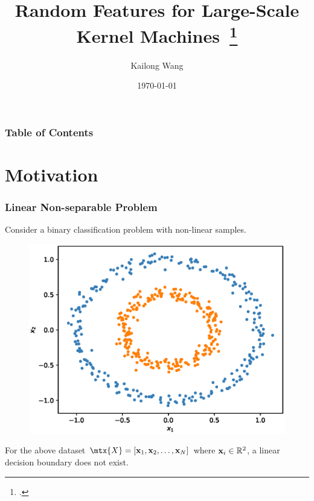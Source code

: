 \documentclass[10pt]{../formats/RU}
\title[Random Fourier Feature]{Random Features for Large-Scale Kernel Machines~\footcite{NIPS2007_013a006f}
}
\author[Kai] %
{Kailong Wang\inst{1}
}
\institute[Rutgers] %
{
  \inst{1}%
  Rutgers University
}
\date[\today] %
{
  \today}
\begin{document}
\frame{\titlepage}
\begin{frame}
\frametitle{Table of Contents}
\tableofcontents
\end{frame}



\section{Motivation}
\begin{frame}
  \frametitle{Linear Non-separable Problem}
  Consider a binary classification problem with non-linear samples.
  \begin{figure}
    \includegraphics[height=0.5\textheight]{./figs/2d_poly_circle.eps}%
  \end{figure}
  \eg For the above dataset $\mtx{X}=[\vec{x}_1, \vec{x}_2, \ldots, \vec{x}_N]$ where $\mathbf{x}_i\in \mathbb{R}^2$, a linear decision boundary does not exist.
\end{frame}
\end{document}
